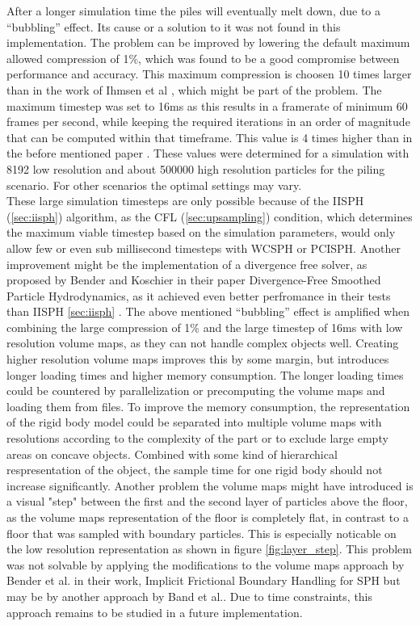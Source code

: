 \documentclass[intern]{cgMA}
\begin{document}
    After a longer simulation time the piles will eventually melt down, due to a \enquote{bubbling} effect. Its cause or a solution to it was not found in this implementation. The problem can be improved by lowering the default maximum allowed compression of 1\%, which was found to be a good compromise between performance and accuracy. This maximum compression is choosen 10 times larger than in the work of Ihmsen et al \cite{6570475}, which might be part of the problem. The maximum timestep was set to 16ms as this results in a framerate of minimum 60 frames per second, while keeping the required iterations in an order of magnitude that can be computed within that timeframe. This value is 4 times higher than in the before mentioned paper \cite{6570475}. These values were determined for a simulation with 8192 low resolution and about 500000 high resolution particles for the piling scenario. For other scenarios the optimal settings may vary.\\
    These large simulation timesteps are only possible because of the IISPH (\ref{sec:iisph}) algorithm, as the CFL (\ref{sec:upsampling}) condition, which determines the maximum viable timestep based on the simulation parameters, would only allow few or even sub millisecond timesteps with WCSPH or PCISPH. Another improvement might be the implementation of a divergence free solver, as proposed by Bender and Koschier in their paper Divergence-Free Smoothed Particle Hydrodynamics, as it achieved even better perfromance in their tests than IISPH \ref{sec:iisph} \cite{10.1145/2786784.2786796}.
    The above mentioned \enquote{bubbling} effect is amplified when combining the large compression of 1\% and the large timestep of 16ms with low resolution volume maps, as they can not handle complex objects well. Creating higher resolution volume maps improves this by some margin, but introduces longer loading times and higher memory consumption. 
    The longer loading times could be countered by parallelization or precomputing the volume maps and loading them from files.
    To improve the memory consumption, the representation of the rigid body model could be separated into multiple volume maps with resolutions according to the complexity of the part or to exclude large empty areas on concave objects. Combined with some kind of hierarchical respresentation of the object, the sample time for one rigid body should not increase significantly.
    Another problem the volume maps might have introduced is a visual "step" between the first and the second layer of particles above the floor, as the volume maps representation of the floor is completely flat, in contrast to a floor that was sampled with boundary particles. This is especially noticable on the low resolution representation as shown in figure \ref{fig:layer_step}. This problem was not solvable by applying the modifications to the volume maps approach by Bender et al. in their work, Implicit Frictional Boundary Handling for SPH \cite{9123549} but may be by another approach by Band et al.\cite{10.1145/3180486}. Due to time constraints, this approach remains to be studied in a future implementation.
\end{document}
